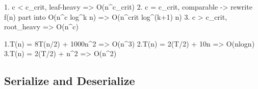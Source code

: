 \documentclass[
]{article}
\newenvironment{Shaded}{}{}
\newcommand{\DecValTok}[1]{\textcolor[rgb]{0.25,0.63,0.44}{#1}}
\newcommand{\FloatTok}[1]{\textcolor[rgb]{0.25,0.63,0.44}{#1}}
\newcommand{\NormalTok}[1]{#1}
\newcommand{\OperatorTok}[1]{\textcolor[rgb]{0.40,0.40,0.40}{#1}}
\begin{document}
\begin{Shaded}
\begin{Highlighting}[]
\FloatTok{1.}\NormalTok{ c }\OperatorTok{\textless{}}\NormalTok{ c\_crit, leaf}\OperatorTok{{-}}\NormalTok{heavy }\OperatorTok{=\textgreater{}}\NormalTok{ O(n}\OperatorTok{\^{}}\NormalTok{c\_crit)}
\FloatTok{2.}\NormalTok{ c }\OperatorTok{=}\NormalTok{ c\_crit, comparable }\OperatorTok{{-}\textgreater{}}\NormalTok{ rewrite f(n) part into O(n}\OperatorTok{\^{}}\NormalTok{c log}\OperatorTok{\^{}}\NormalTok{k n) }\OperatorTok{=\textgreater{}}\NormalTok{ O(n}\OperatorTok{\^{}}\NormalTok{crit log}\OperatorTok{\^{}}\NormalTok{(k}\OperatorTok{+}\DecValTok{1}\NormalTok{) n)}
\FloatTok{3.}\NormalTok{ c }\OperatorTok{\textgreater{}}\NormalTok{ c\_crit, root\_heavy }\OperatorTok{=\textgreater{}}\NormalTok{ O(n}\OperatorTok{\^{}}\NormalTok{c)}

\FloatTok{1.}\NormalTok{T(n) }\OperatorTok{=} \DecValTok{8}\NormalTok{T(n}\OperatorTok{/}\DecValTok{2}\NormalTok{) }\OperatorTok{+} \DecValTok{1000}\NormalTok{n}\OperatorTok{\^{}}\DecValTok{2} \OperatorTok{=\textgreater{}}\NormalTok{ O(n}\OperatorTok{\^{}}\DecValTok{3}\NormalTok{)}
\FloatTok{2.}\NormalTok{T(n) }\OperatorTok{=} \DecValTok{2}\NormalTok{(T}\OperatorTok{/}\DecValTok{2}\NormalTok{) }\OperatorTok{+} \DecValTok{10}\NormalTok{n }\OperatorTok{=\textgreater{}}\NormalTok{ O(nlogn)}
\FloatTok{3.}\NormalTok{T(n) }\OperatorTok{=} \DecValTok{2}\NormalTok{(T}\OperatorTok{/}\DecValTok{2}\NormalTok{) }\OperatorTok{+}\NormalTok{ n}\OperatorTok{\^{}}\DecValTok{2} \OperatorTok{=\textgreater{}}\NormalTok{ O(n}\OperatorTok{\^{}}\DecValTok{2}\NormalTok{)}
\end{Highlighting}
\end{Shaded}

\hypertarget{serialize-and-deserialize}{%
\subsection{Serialize and Deserialize}\label{serialize-and-deserialize}}
\end{document}
